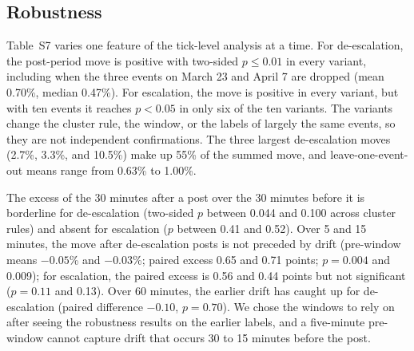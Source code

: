 \documentclass[11pt]{article}
\begin{document}
\subsection{Robustness}

Table~S7 varies one feature of the tick-level analysis at a time. For de-escalation, the post-period move is positive with two-sided $p \leq 0.01$ in every variant, including when the three events on March 23 and April 7 are dropped (mean 0.70\%, median 0.47\%). For escalation, the move is positive in every variant, but with ten events it reaches $p < 0.05$ in only six of the ten variants. The variants change the cluster rule, the window, or the labels of largely the same events, so they are not independent confirmations. The three largest de-escalation moves (2.7\%, 3.3\%, and 10.5\%) make up 55\% of the summed move, and leave-one-event-out means range from 0.63\% to 1.00\%.

The excess of the 30 minutes after a post over the 30 minutes before it is borderline for de-escalation (two-sided $p$ between 0.044 and 0.100 across cluster rules) and absent for escalation ($p$ between 0.41 and 0.52). Over 5 and 15 minutes, the move after de-escalation posts is not preceded by drift (pre-window means $-0.05$\% and $-0.03$\%; paired excess 0.65 and 0.71 points; $p = 0.004$ and 0.009); for escalation, the paired excess is 0.56 and 0.44 points but not significant ($p = 0.11$ and 0.13). Over 60 minutes, the earlier drift has caught up for de-escalation (paired difference $-0.10$, $p = 0.70$). We chose the windows to rely on after seeing the robustness results on the earlier labels, and a five-minute pre-window cannot capture drift that occurs 30 to 15 minutes before the post.
\end{document}
